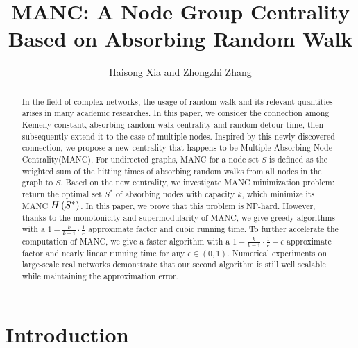 \documentclass[sigconf]{acmart}
\begin{document}
\sloppy
\fancyhead{}
\title{MANC: A Node Group Centrality Based on Absorbing Random Walk}
\author{Haisong Xia and Zhongzhi Zhang \footnotemark}
\begin{abstract}
    In the field of complex networks, the usage of random walk and its relevant quantities arises in many academic researches.
    In this paper, we consider the connection among Kemeny constant, absorbing random-walk centrality and random detour time, then subsequently extend it to the case of multiple nodes.
    Inspired by this newly discovered connection, we propose a new centrality that happens to be Multiple Absorbing Node Centrality(MANC).
    For undirected graphs, MANC for a node set \(S\) is defined as the weighted sum of the hitting times of absorbing random walks from all nodes in the graph to \(S\).
    Based on the new centrality, we investigate MANC minimization problem: return the optimal set \(S^*\) of absorbing nodes with capacity \(k\), which minimize its MANC \(H\left(S^*\right)\).
    In this paper, we prove that this problem is NP-hard.
    However, thanks to the monotonicity and supermodularity of MANC, we give greedy algorithms with a \(1-\frac{k}{k-1}\cdot\frac{1}{e}\) approximate factor and cubic running time.
    To further accelerate the computation of MANC, we give a faster algorithm with a \(1-\frac{k}{k-1}\cdot\frac{1}{e}-\epsilon\) approximate factor and nearly linear running time for any \(\epsilon\in(0,1)\).
    Numerical experiments on large-scale real networks demonstrate that our second algorithm is still well scalable while maintaining the approximation error.
\end{abstract}
\maketitle
\renewcommand{\thefootnote}{*}

\section{Introduction}\label{sec:intro}
\end{document}
